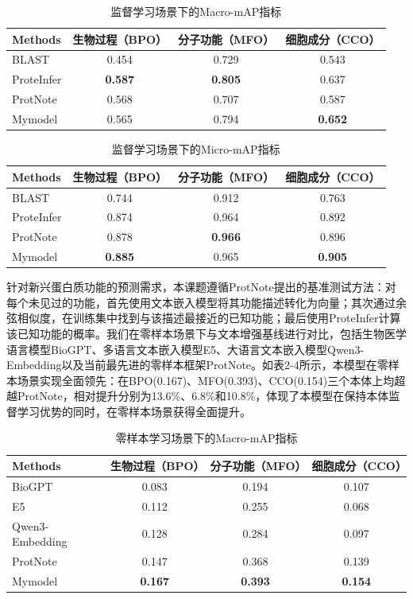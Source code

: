 \begin{table}[h]
\centering
\caption{监督学习场景下的Macro-mAP指标}
\begin{tabular}{lccc}
\hline
Methods & 生物过程（BPO） & 分子功能（MFO） & 细胞成分（CCO） \\
\hline
BLAST & 0.454 & 0.729 & 0.543 \\
ProteInfer & \textbf{0.587} & \textbf{0.805} & 0.637 \\
ProtNote & 0.568 & 0.707 & 0.587 \\
Mymodel & 0.565 & 0.794 & \textbf{0.652} \\
\hline
\end{tabular}
\end{table}

\begin{table}[h]
\centering
\caption{监督学习场景下的Micro-mAP指标}
\begin{tabular}{lccc}
\hline
Methods & 生物过程（BPO） & 分子功能（MFO） & 细胞成分（CCO） \\
\hline
BLAST & 0.744 & 0.912 & 0.763 \\
ProteInfer & 0.874 & 0.964 & 0.892 \\
ProtNote & 0.878 & \textbf{0.966} & 0.896 \\
Mymodel & \textbf{0.885} & 0.965 & \textbf{0.905} \\
\hline
\end{tabular}
\end{table}

针对新兴蛋白质功能的预测需求，本课题遵循ProtNote\cite{char2025protnote}提出的基准测试方法：对每个未见过的功能，首先使用文本嵌入模型将其功能描述转化为向量；其次通过余弦相似度，在训练集中找到与该描述最接近的已知功能；最后使用ProteInfer计算该已知功能的概率。我们在零样本场景下与文本增强基线进行对比，包括生物医学语言模型BioGPT\cite{luo2022biogpt}、多语言文本嵌入模型E5\cite{wang2024multilingual}、大语言文本嵌入模型Qwen3-Embedding\cite{qwen3embedding}以及当前最先进的零样本框架ProtNote\cite{char2025protnote}。如表2-4所示，本模型在零样本场景实现全面领先：在BPO(0.167)、MFO(0.393)、CCO(0.154)三个本体上均超越ProtNote，相对提升分别为13.6\%、6.8\%和10.8\%，体现了本模型在保持本体监督学习优势的同时，在零样本场景获得全面提升。

\begin{table}[h]
\centering
\caption{零样本学习场景下的Macro-mAP指标}
\begin{tabular}{lccc}
\hline
Methods & 生物过程（BPO） & 分子功能（MFO） & 细胞成分（CCO） \\
\hline
BioGPT & 0.083 & 0.194 & 0.107 \\
E5 & 0.112 & 0.255 & 0.068 \\
Qwen3-Embedding & 0.128 & 0.284 & 0.097 \\
ProtNote & 0.147 & 0.368 & 0.139 \\
Mymodel & \textbf{0.167} & \textbf{0.393} & \textbf{0.154} \\
\hline
\end{tabular}
\end{table}

